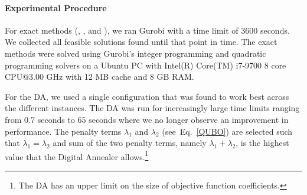 \documentclass[preprint,12pt]{elsarticle}
\newcommand{\todo}[1]{{\textcolor{red}{\bf {#1}}}}
\newcommand{\qcls}{{\sf {\small QC-LS\xspace}}}
\newcommand{\ilpls}{{\sf {\small ILP-LS\xspace}}}
\newcommand{\quls}{{\sf {\small QU-LS\xspace}}}
\newcommand{\qcss}{{\sf {\small QC-SS\xspace}}}
\newcommand{\qcssgrb}{{\sf {\small QC-SS(GRB)\xspace}}}
\begin{document}
\paragraph{Experimental Procedure}

For exact methods (\qcss{}, \ilpls{}, \qcls{} and \quls{}),
we ran Gurobi with a time limit of 3600 seconds. We collected all feasible solutions
found until that point in time. The exact methods were solved using Gurobi's integer programming and quadratic programming solvers on a 
Ubuntu PC with Intel(R) Core(TM) i7-9700 8 core CPU@3.00 GHz with 12 MB cache and 8 GB RAM.

For the DA, we used a single configuration that was found to work best across the different instances. 
The DA was run for increasingly large time limits ranging from $0.7$ seconds to $65$ seconds where we no longer observe an improvement in 
performance. The penalty terms $\lambda_1$ and $\lambda_2$ (see~Eq.~\eqref{QUBO}) are selected such that $\lambda_1= \lambda_2$ and sum of the two penalty terms, namely $\lambda_1+\lambda_2$, 
is the highest value that the Digital Annealer allows.\footnote{The DA has an upper limit on the size of objective function coefficients.} 
 


 


%
%
%
\end{document}
